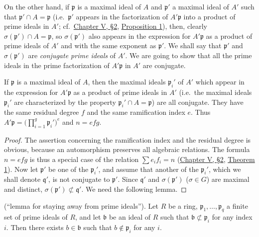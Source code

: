 On the other hand, if $\mathfrak{p}$ is a maximal ideal of $A$ and
$\mathfrak{p}'$ a maximal ideal of $A'$ such that
$\mathfrak{p}'\cap A=\mathfrak{p}$ (i.e.\ $\mathfrak{p}'$ appears in the
factorization of $A'\mathfrak{p}$ into a product of prime ideals in $A'$;
cf.\ \hyperref[sec:5.2]{Chapter V, §2}, \hyperref[prop:V.2.1]{Proposition 1}), then, clearly
$\sigma(\mathfrak{p}')\cap A=\mathfrak{p}$, so
$\sigma(\mathfrak{p}')$ also appears in the expression for
$A'\mathfrak{p}$ as a product of prime ideals of $A'$ and with the same
exponent as $\mathfrak{p}'$. We shall say that $\mathfrak{p}'$ and
$\sigma(\mathfrak{p}')$ are \emph{conjugate prime ideals} of $A'$. We are
going to show that all the prime ideals in the prime factorization of
$A'\mathfrak{p}$ in $A'$ are conjugate.

\begin{proposition}
\label{prop:VI.2.1}
If $\mathfrak{p}$ is a maximal ideal of $A$, then the maximal ideals
$\mathfrak{p}_{i}'$ of $A'$ which appear in the expression for
$A'\mathfrak{p}$ as a product of prime ideals in $A'$ (i.e.\ the maximal
ideals $\mathfrak{p}_{i}'$ are characterized by the property
$\mathfrak{p}_{i}'\cap A=\mathfrak{p}$) are all conjugate. They have the
same residual degree $f$ and the same ramification index $e$. Thus
$A'\mathfrak{p}=\bigl(\prod_{i=1}^{g}\mathfrak{p}_{i}'\bigr)^{e}$ and
$n=efg$.
\end{proposition}

\begin{proof}
The assertion concerning the ramification index and the residual degree is
obvious, because an automorphism preserves all algebraic relations. The
formula $n=efg$ is thus a special case of the relation
$\sum e_{i}f_{i}=n$ (\hyperref[sec:5.2]{Chapter V, §2}, \hyperref[thm:V.2.1]{Theorem 1}). Now let $\mathfrak{p}'$ be
one of the $\mathfrak{p}_{i}'$, and assume that another of the
$\mathfrak{p}_{i}'$, which we shall denote $\mathfrak{q}'$, is not
conjugate to $\mathfrak{p}'$. Since $\mathfrak{q}'$ and
$\sigma(\mathfrak{p}')$ ($\sigma\in G$) are maximal and distinct,
$\sigma(\mathfrak{p}')\not\subset\mathfrak{q}'$. We need the following
lemma.
\end{proof}

\begin{lemma}
\label{lem:VI.2.1}
(``lemma for staying away from prime ideals''). Let $R$ be a ring,
$\mathfrak{p}_{1},\ldots,\mathfrak{p}_{q}$ a finite set of prime ideals of
$R$, and let $\mathfrak{b}$ be an ideal of $R$ such that
$\mathfrak{b}\not\subset\mathfrak{p}_{i}$ for any index $i$. Then there
exists $b\in\mathfrak{b}$ such that $b\notin\mathfrak{p}_{i}$ for any $i$.
\end{lemma}

